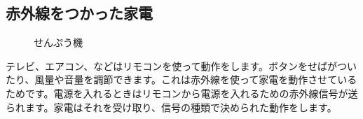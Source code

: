 \documentclass[text05.tex]{subfiles}
\begin{document}
\subsection{赤外線をつかった家電}

\begin{figure}[H]
  \begin{minipage}[t]{0.3\columnwidth}
    \centering
 
    \caption{テレビ}
  \end{minipage}
  \begin{minipage}[t]{0.3\columnwidth}
    \centering
    
    \caption{エアコン}
  \end{minipage}
  \begin{minipage}[t]{0.3\columnwidth}
    \centering
    
    \caption{せんぷう機}
  \end{minipage}
\end{figure}

テレビ、エアコン、などはリモコンを使って動作をします。ボタンをせばがついたり、風量や音量を調節できます。これは赤外線を使って家電を動作させているためです。電源を入れるときはリモコンから電源を入れるための赤外線信号が送られます。家電はそれを受け取り、信号の種類で決められた動作をします。
\end{document}
